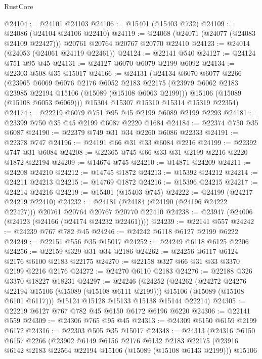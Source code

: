 \begin{lexlean}{RustCore}
\begin{coremodule}
@24104 := @24101 @24103
@24106 := @15401 (@15403 @732)
@24109 := @24086 (@24104 @24106 @22410)
@24119 := @24068 (@24071 (@24077 (@24083 @24109 @22427))) @20761 @20764 @20767 @20770 @22410
@24123 := @24014 (@24053 (@24061 @24119 @22461))
@24124 := @22141 @540
@24127 := @24124 @751 @95 @45
@24131 := @24127 @6070 @6079 @2199 @6092
@24134 := @22303 @508 @35 @15017
@24166 := @24131
    (@24134
      @6070
      @6077
      @2266
      (@23965
        @6069
        @6076
        @2176
        @6052
        @2183
        @22175
        (@23979 @6062 @2183 @23985 @22194 @15106 (@15089 (@15108 @6063 @2199)))
        @15106
        (@15089 (@15108 @6053 @6069)))
      @15304
      @15307
      @15310
      @15314
      @15319
      @22354)
@24174 := @22219 @6079 @751 @95 @45 @2199 @6089 @2199 @2293
@24181 := @23399 @750 @35 @45 @2199 @6087 @2220 @1684
@24184 := @22374 @750 @35 @6087
@24190 := @22379 @749 @31 @34 @2260 @6086 @22333
@24191 := @22378 @747
@24196 := @24191 @66 @31 @33 @6084 @2216
@24199 := @22392 @747 @31 @6084
@24208 := @22365 @745 @66 @33 @31 @2199 @2216 @2220 @1872 @22194
@24209 := @14674 @745
@24210 := @14871 @24209
@24211 := @24208 @24210
@24212 := @14745 @1872
@24213 := @15392 @24212
@24214 := @24211 @24213
@24215 := @14769 @1872
@24216 := @15396 @24215
@24217 := @24214 @24216
@24219 := @15401 (@15403 @745)
@24222 := @24199 (@24217 @24219 @22410)
@24232 := @24181 (@24184 (@24190 (@24196 @24222 @22427))) @20761 @20764 @20767 @20770 @22410
@24238 := @23947 (@24006 (@24123 (@24166 (@24174 @24232 @22461))))
@24239 := @22141 @557
@24242 := @24239 @767 @782 @45
@24246 := @24242 @6118 @6127 @2199 @6222
@24249 := @22151 @556 @35 @15017
@24252 := @24249 @6118 @6125 @2206
@24256 := @22159 @329 @31 @34 @2186
@24262 := @24256 @6117 @6124 @2176 @6100 @2183 @22175
@24270 := @22158 @327 @66 @31 @33 @3370 @2199 @2216 @2176
@24272 := @24270 @6110 @2183
@24276 := @22188 @326 @3370 @18227 @18231
@24297 := @24246
    (@24252
      (@24262
        (@24272 @24276 @22194 @15106 (@15089 (@15108 @6111 @2199)))
        @15106
        (@15089 (@15108 @6101 @6117)))
      @15124
      @15128
      @15133
      @15138
      @15144
      @22214)
@24305 := @22219 @6127 @767 @782 @45 @6150 @6172 @6196 @6220
@24306 := @22141 @559
@24309 := @24306 @765 @95 @45
@24313 := @24309 @6150 @6159 @2199 @6172
@24316 := @22303 @505 @35 @15017
@24348 := @24313
    (@24316
      @6150
      @6157
      @2266
      (@23902
        @6149
        @6156
        @2176
        @6132
        @2183
        @22175
        (@23916 @6142 @2183 @22564 @22194 @15106 (@15089 (@15108 @6143 @2199)))
        @15106

\end{coremodule}
\end{lexlean}
